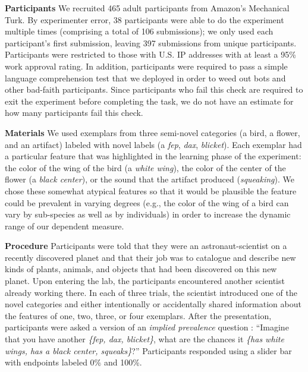 \documentclass[10pt,letterpaper]{article}
\begin{document}
\noindent\textbf{Participants}
We recruited 465 adult participants from Amazon's Mechanical Turk. 
By experimenter error, 38 participants were able to do the experiment multiple times (comprising a total of 106 submissions); we only used each participant's first submission, leaving 397 submissions from unique participants. 
Participants were restricted to those with U.S. IP addresses with at least a 95\% work approval rating. 
In addition, participants were required to pass a simple language comprehension test that we deployed in order to weed out bots and other bad-faith participants. 
Since participants who fail this check are required to exit the experiment before completing the task, we do not have an estimate for how many participants fail this check. 



\noindent\textbf{Materials}
We used exemplars from three semi-novel categories (a bird, a flower, and an artifact) labeled with novel labels (a \emph{fep}, \emph{dax}, \emph{blicket}).
Each exemplar had a particular feature that was highlighted in the learning phase of the experiment: the color of the wing of the bird (a \emph{white wing}), the color of the center of the flower (a \emph{black center}), or the sound that the artifact produced (\emph{squeaking}). 
We chose these somewhat atypical features so that it would be plausible the feature could be prevalent in varying degrees (e.g., the color of the wing of a bird can vary by sub-species as well as by individuals) in order to increase the dynamic range of our dependent measure. 

\noindent\textbf{Procedure}
Participants were told that they were an astronaut-scientist on a recently discovered planet and that their job was to catalogue and describe new kinds of plants, animals, and objects that had been discovered on this new planet.  
Upon entering the lab, the participants encountered another scientist already working there. 
In each of three trials, the scientist introduced one of the novel categories and either intentionally or accidentally shared information about the features of one, two, three, or four exemplars. 
After the presentation, participants were asked a version of an \emph{implied prevalence} question \cite{Gelman2002, Cimpian2010a, tessler2020learning}: ``Imagine that you have another \emph{\{fep, dax, blicket\}}, what are the chances it \emph{\{has white wings, has a black center, squeaks\}}?'' 
Participants responded using a slider bar with endpoints labeled 0\% and 100\%.
\end{document}
